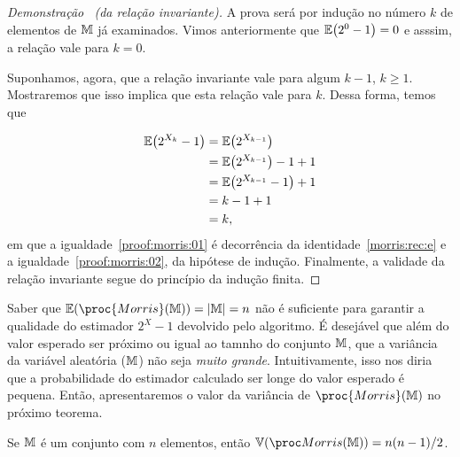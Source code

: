 \begin{proof}[Demonstração \ (da relação invariante)]
  A prova será por indução no número $k$ de elementos de $\mathbb{M}$ já examinados. Vimos anteriormente que 
  $\mathbb{E}\big(2^0 - 1 \big) = 0$ e asssim, a relação vale para $k = 0$.

  Suponhamos, agora, que a relação invariante vale para algum $k - 1$, $k \geq 1$. Mostraremos que isso implica que esta
  relação vale para $k$. Dessa forma, temos que

  \begin{align}
      \mathbb{E}\big(2^{X_k} - 1\big) 
      &= \mathbb{E}\big(2^{X_{k-1}}\big)  \label{proof:morris:01}  \\
      &= \mathbb{E}\big(2^{X_{k-1}}\big) - 1 + 1 \nonumber \\
      &= \mathbb{E}\big(2^{X_{k-1}} - 1\big) + 1 \nonumber \\
      &= k - 1 + 1 \label{proof:morris:02} \\ 
      &= k \nonumber,
  \end{align}    
    em que a igualdade~\eqref{proof:morris:01} é decorrência da identidade~\eqref{morris:rec:e} e a 
    igualdade~\eqref{proof:morris:02}, da hipótese de indução. Finalmente, a validade da relação invariante segue do 
    princípio da indução finita.
\end{proof}  

Saber que $\Ebb(\proc{Morris}(\Mbb)) = |\Mbb| = n$ não é suficiente para garantir a qualidade do estimador $2^{X} - 1$
devolvido pelo algoritmo. É desejável que além do valor esperado ser próximo ou igual ao tamnho do conjunto $\mathbb{M}$, que
a variância da variável aleatória ($\mathbb{M}$) não seja \textit{muito grande}. Intuitivamente, isso nos diria 
que a probabilidade do estimador calculado ser longe do valor esperado é pequena. Então, apresentaremos o valor da 
variância de $\proc{Morris}(\Mbb)$ no próximo teorema.

\begin{theorem}[da variância]
  \label{morris:theorem:variance}
  Se $\mathbb{M}$ é um conjunto com $n$ elementos, então $\Vbb(\morrisestimator) = n(n - 1) / 2$.
\end{theorem}

